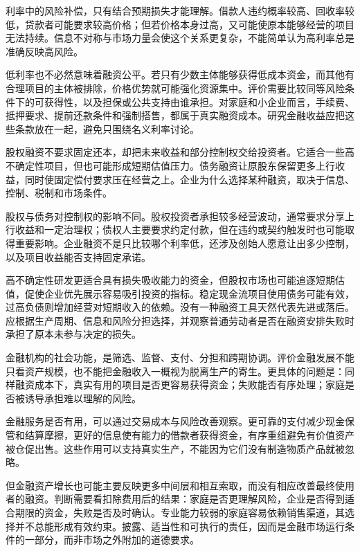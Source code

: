 \documentclass[UTF8,fontset=fandol,zihao=-4,oneside,openany]{ctexbook}
\begin{document}
\label{arg:P107}
利率中的风险补偿，只有结合预期损失才能理解。借款人违约概率较高、回收率较低，贷款者可能要求较高价格；但若价格本身过高，又可能使原本能够经营的项目无法持续。信息不对称与市场力量会使这个关系更复杂，不能简单认为高利率总是准确反映高风险。

低利率也不必然意味着融资公平。若只有少数主体能够获得低成本资金，而其他有合理项目的主体被排除，价格优势就可能强化资源集中。评价需要比较同等风险条件下的可获得性，以及担保或公共支持由谁承担。对家庭和小企业而言，手续费、抵押要求、提前还款条件和强制搭售，都属于真实融资成本。研究金融收益应把这些条款放在一起，避免只围绕名义利率讨论。

股权融资不要求固定还本，却把未来收益和部分控制权交给投资者。它适合一些高不确定性项目，但也可能形成短期估值压力。债务融资让原股东保留更多上行收益，同时使固定偿付要求压在经营之上。企业为什么选择某种融资，取决于信息、控制、税制和市场条件。

\label{arg:P108}
股权与债务对控制权的影响不同。股权投资者承担较多经营波动，通常要求分享上行收益和一定治理权；债权人主要要求约定付款，但在违约或契约触发时也可能取得重要影响。企业融资不是只比较哪个利率低，还涉及创始人愿意让出多少控制，以及项目收益能否支持固定承诺。

高不确定性研发更适合具有损失吸收能力的资金，但股权市场也可能追逐短期估值，促使企业优先展示容易吸引投资的指标。稳定现金流项目使用债务可能有效，过高负债则增加经营对短期收入的依赖。没有一种融资工具天然代表先进或落后。应根据生产周期、信息和风险分担选择，并观察普通劳动者是否在融资安排失败时承担了原本未参与决定的损失。

金融机构的社会功能，是筛选、监督、支付、分担和跨期协调。评价金融发展不能只看资产规模，也不能把金融收入一概视为脱离生产的寄生。更具体的问题是：同样融资成本下，真实有用的项目是否更容易获得资金；失败能否有序处理；家庭是否被诱导承担难以理解的风险。

\label{arg:P109}
金融服务是否有用，可以通过交易成本与风险改善观察。更可靠的支付减少现金保管和结算摩擦，更好的信息使有能力的借款者获得资金，有序重组避免有价值资产被仓促出售。这些作用可以支持真实生产，不能因为它们没有制造物质产品就被忽略。

但金融资产增长也可能主要反映更多中间层和相互索取，而没有相应改善最终使用者的融资。判断需要看扣除费用后的结果：家庭是否更理解风险，企业是否得到适合期限的资金，失败是否及时确认。专业能力较弱的家庭容易依赖销售渠道，其选择并不总能形成有效约束。披露、适当性和可执行的责任，因而是金融市场运行条件的一部分，而非市场之外附加的道德要求。
\end{document}

